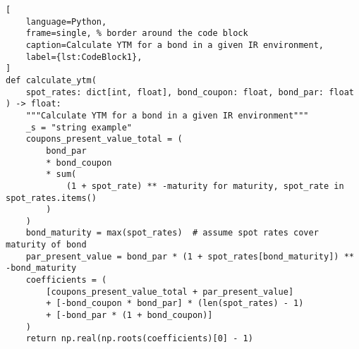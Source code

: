 \begin{minipage}{\linewidth}
\begin{lstlisting}[
    language=Python,
    frame=single, % border around the code block
    caption=Calculate YTM for a bond in a given IR environment,
    label={lst:CodeBlock1},
]
def calculate_ytm(
    spot_rates: dict[int, float], bond_coupon: float, bond_par: float
) -> float:
    """Calculate YTM for a bond in a given IR environment"""
    _s = "string example"
    coupons_present_value_total = (
        bond_par
        * bond_coupon
        * sum(
            (1 + spot_rate) ** -maturity for maturity, spot_rate in spot_rates.items()
        )
    )
    bond_maturity = max(spot_rates)  # assume spot rates cover maturity of bond
    par_present_value = bond_par * (1 + spot_rates[bond_maturity]) ** -bond_maturity
    coefficients = (
        [coupons_present_value_total + par_present_value]
        + [-bond_coupon * bond_par] * (len(spot_rates) - 1)
        + [-bond_par * (1 + bond_coupon)]
    )
    return np.real(np.roots(coefficients)[0] - 1)
\end{lstlisting}
\end{minipage}